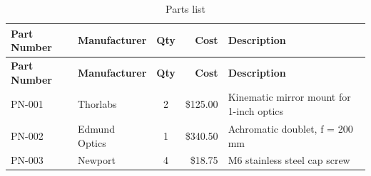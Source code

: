 \FloatBarrier


\begin{longtable}{l l c r p{6cm}}
\caption{Parts list}
\label{tab:parts_list} \\
\hline
\textbf{Part Number} & \textbf{Manufacturer} & \textbf{Qty} & \textbf{Cost} & \textbf{Description} \rule{0pt}{12pt} \\
\hline
\endfirsthead
\hline
\textbf{Part Number} & \textbf{Manufacturer} & \textbf{Qty} & \textbf{Cost} & \textbf{Description} \rule{0pt}{12pt} \\
\hline
\endhead

\hline
\endfoot

PN-001 & Thorlabs & 2 & \$125.00 & Kinematic mirror mount for 1-inch optics \\
PN-002 & Edmund Optics & 1 & \$340.50 & Achromatic doublet, f = 200 mm \\
PN-003 & Newport & 4 & \$18.75 & M6 stainless steel cap screw \\
\hline
\end{longtable}
